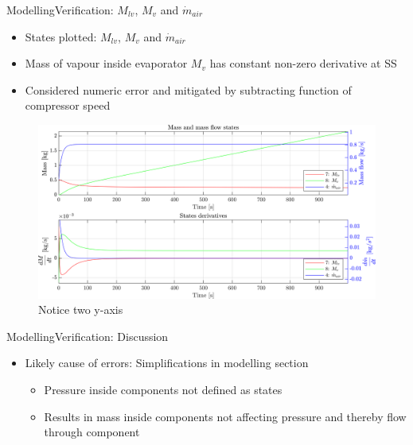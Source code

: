 \begin{frame}{Modelling}{Verification: $M_{lv}$, $M_{v}$ and $\dot{m}_{air}$}
	\begin{itemize}
		\item States plotted: $M_{lv}$, $M_v$ and $\dot{m}_{air}$
		\item Mass of vapour inside evaporator $M_v$ has constant non-zero derivative at SS
		\item Considered numeric error and mitigated by subtracting function of compressor speed
	\end{itemize}
	\begin{figure}[h]
		\centering
		\includegraphics[width=1\textwidth]{../Graphics/nonlin_sim_Mass_Mvfucked.png}
		\caption{Notice two y-axis}
		\label{fig:non_lin_sim_Mass_Mvfucked}
		
	\end{figure}
	
\end{frame}




\begin{frame}{Modelling}{Verification: Discussion}
	\begin{itemize}
		\item Likely cause of errors: Simplifications in modelling section
		\begin{itemize}
			\item Pressure inside components not defined as states
			\item Results in mass inside components not affecting pressure and thereby flow through component
		\end{itemize}
	\end{itemize}

\end{frame}



